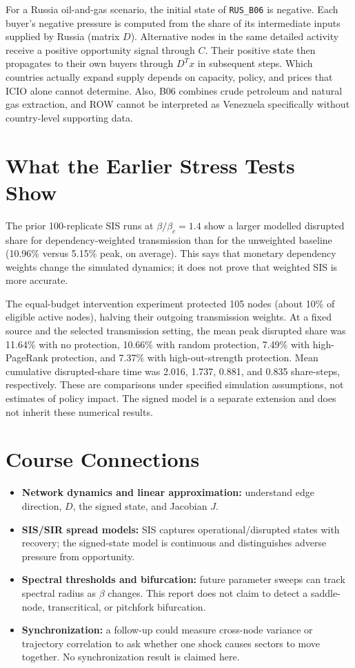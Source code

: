 \documentclass[conference,a4paper,twoside]{IEEEtran}
\begin{document}
For a Russia oil-and-gas scenario, the initial state of \texttt{RUS\_B06} is negative. Each buyer's negative pressure is computed from the share of its intermediate inputs supplied by Russia (matrix $D$). Alternative nodes in the same detailed activity receive a positive opportunity signal through $C$. Their positive state then propagates to their own buyers through $D^T x$ in subsequent steps. Which countries actually expand supply depends on capacity, policy, and prices that ICIO alone cannot determine. Also, B06 combines crude petroleum and natural gas extraction, and ROW cannot be interpreted as Venezuela specifically without country-level supporting data.

\section{What the Earlier Stress Tests Show}
The prior 100-replicate SIS runs at $\beta/\beta_c=1.4$ show a larger modelled disrupted share for dependency-weighted transmission than for the unweighted baseline (10.96\% versus 5.15\% peak, on average). This says that monetary dependency weights change the simulated dynamics; it does not prove that weighted SIS is more accurate.

The equal-budget intervention experiment protected 105 nodes (about 10\% of eligible active nodes), halving their outgoing transmission weights. At a fixed source and the selected transmission setting, the mean peak disrupted share was 11.64\% with no protection, 10.66\% with random protection, 7.49\% with high-PageRank protection, and 7.37\% with high-out-strength protection. Mean cumulative disrupted-share time was 2.016, 1.737, 0.881, and 0.835 share-steps, respectively. These are comparisons under specified simulation assumptions, not estimates of policy impact. The signed model is a separate extension and does not inherit these numerical results.

\section{Course Connections}
\begin{itemize}
\item \textbf{Network dynamics and linear approximation:} understand edge direction, $D$, the signed state, and Jacobian $J$.
\item \textbf{SIS/SIR spread models:} SIS captures operational/disrupted states with recovery; the signed-state model is continuous and distinguishes adverse pressure from opportunity.
\item \textbf{Spectral thresholds and bifurcation:} future parameter sweeps can track spectral radius as $\beta$ changes. This report does not claim to detect a saddle-node, transcritical, or pitchfork bifurcation.
\item \textbf{Synchronization:} a follow-up could measure cross-node variance or trajectory correlation to ask whether one shock causes sectors to move together. No synchronization result is claimed here.
\end{itemize}
\end{document}
